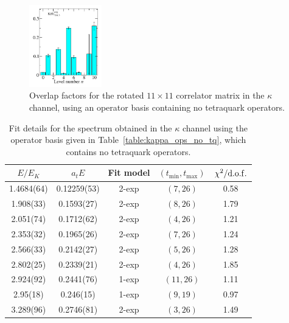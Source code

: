 \begin{figure}
  \includegraphics[width=0.28\textwidth]{figures/spectrum_a1g/no_tq/zfactors/zfactor_kaon-P000-A1g_1-TDU_5.pdf}
  \caption{Overlap factors for the rotated $11\times 11$ correlator matrix in the $\kappa$ channel, using an operator basis containing no tetraquark operators.}
  \label{fig:kappa_no_tq_zfactors}
\end{figure}

\begin{table}
  \centering
  \begin{tabular}{c|c|c|c|c}
    $E / E_K$ & $a_t E$ & Fit model & $(t_{\mathrm{min}}, {t_\mathrm{max}})$ & $\chi^2 / \rm{d.o.f.}$\\
    \hline
    1.4684(64)&0.12259(53)&2{-}exp&$(7, 26)$&0.58\\
1.908(33)&0.1593(27)&2{-}exp&$(8, 26)$&1.79\\%
2.051(74)&0.1712(62)&2{-}exp&$(4, 26)$&1.21\\
2.353(32)&0.1965(26)&2{-}exp&$(7, 26)$&1.24\\
2.566(33)&0.2142(27)&2{-}exp&$(5, 26)$&1.28\\
2.802(25)&0.2339(21)&2{-}exp&$(4, 26)$&1.85\\
2.924(92)&0.2441(76)&1{-}exp&$(11, 26)$&1.11\\
2.95(18)&0.246(15)&1{-}exp&$(9, 19)$&0.97\\
3.289(96)&0.2746(81)&2{-}exp&$(3, 26)$&1.49
  \end{tabular}
  \caption{Fit details for the spectrum obtained in the $\kappa$ channel using the operator basis given in Table~\ref{table:kappa_ops_no_tq}, which contains no tetraquark operators.}
  \label{table:kappa_no_tq_spectrum}
\end{table}

